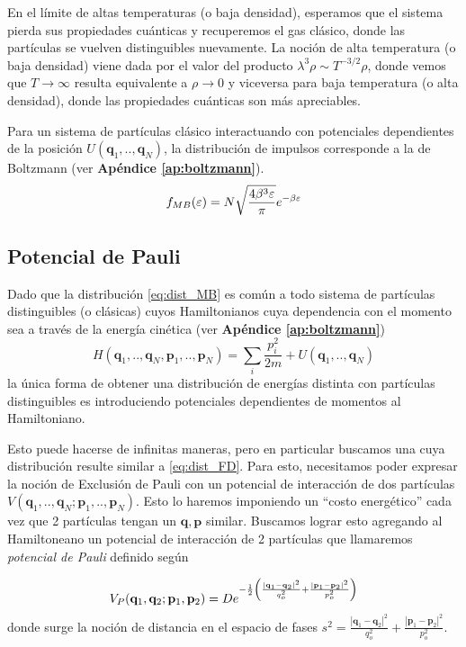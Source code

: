 En el límite de altas temperaturas (o baja densidad), esperamos que el sistema pierda sus propiedades cuánticas y recuperemos el gas clásico, donde las partículas
se vuelven distinguibles nuevamente.
La noción de alta temperatura (o baja densidad) viene dada por el valor del producto $\lambda^3\rho \sim T^{-3/2}\rho$, donde vemos que $T\to\infty$ resulta equivalente a $\rho\to0$
y viceversa para baja temperatura (o alta densidad), donde las propiedades cuánticas son más apreciables.

Para un sistema de partículas clásico interactuando con potenciales dependientes de la posición $U(\mathbf{q}_1,..,\mathbf{q}_N)$, la distribución de impulsos
corresponde a la de Boltzmann (ver \textbf{Apéndice \ref{ap:boltzmann}}).
\begin{equation}{\label{eq:dist_MB}}
 f_{MB}(\varepsilon) = N\sqrt{\frac{4\beta^3\varepsilon}{\pi}}e^{-\beta\varepsilon}
\end{equation}


\subsection{Potencial de Pauli}{\label{sec:intro_pauli}}

Dado que la distribución \eqref{eq:dist_MB} es común a todo sistema de partículas distinguibles (o clásicas) cuyos Hamiltonianos cuya dependencia con el momento
sea a través de la energía cinética (ver  \textbf{Apéndice \ref{ap:boltzmann}})
\[ H(\mathbf{q}_1,..,\mathbf{q}_N,\mathbf{p}_1,..,\mathbf{p}_N) = \sum_i \frac{p_i^2}{2m} + U(\mathbf{q}_1,..,\mathbf{q}_N)\]
la única forma de obtener una distribución de energías distinta con partículas distinguibles es introduciendo potenciales dependientes de momentos al Hamiltoniano.

Esto puede hacerse de infinitas maneras, pero en particular buscamos una cuya distribución resulte similar a \eqref{eq:dist_FD}.
Para esto, necesitamos poder expresar la noción de Exclusión de Pauli con un potencial de interacción de dos partículas $V(\mathbf{q}_1,..,\mathbf{q}_N;\mathbf{p}_1,..,\mathbf{p}_N)$.
Esto lo haremos imponiendo un ``costo energético'' cada vez que 2 partículas tengan un $\mathbf{q}, \mathbf{p}$ similar.
Buscamos lograr esto agregando al Hamiltoneano un potencial de interacción de 2 partículas que llamaremos \textit{potencial de Pauli} definido según

\begin{equation}{\label{eq:def_int_pauli}}
 V_P(\mathbf{q}_1,\mathbf{q}_2;\mathbf{p}_1,\mathbf{p}_2) = De^{-\frac{1}{2}\left( \frac{|\mathbf{q}_1-\mathbf{q}_2|^2}{q_o^2} +\frac{|\mathbf{p}_1-\mathbf{p}_2|^2}{p_o^2} \right)}
\end{equation}
donde surge la noción de distancia en el espacio de fases $s^2 = \frac{|\mathbf{q}_1-\mathbf{q}_2|^2}{q_o^2} +\frac{|\mathbf{p}_1-\mathbf{p}_2|^2}{p_o^2}$.

